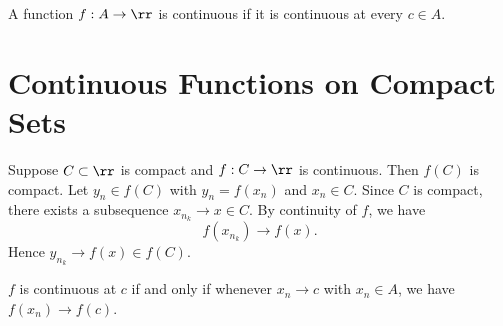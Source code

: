 \begin{definition}[Continuous]
    A function $f:A\to\rr$ is continuous if it is continuous at every $c\in A$.
\end{definition}

\section{Continuous Functions on Compact Sets}

\begin{theorem}{
    Suppose $C\subset\rr$ is compact and $f:C\to \rr$ is continuous.
    Then $f(C)$ is compact.
}
    Let $y_n\in f(C)$ with $y_n = f(x_n)$ and $x_n\in C$.
    Since $C$ is compact, there exists a subsequence $x_{n_k}\to x\in C$.
    By continuity of $f$, we have
    \[
        f(x_{n_k}) \to f(x).
    \]
    Hence $y_{n_k}\to f(x)\in f(C)$.
\end{theorem}

\begin{corollary}
    $f$ is continuous at $c$ if and only if whenever $x_n\to c$ with $x_n\in A$, we have $f(x_n)\to f(c)$.
\end{corollary}
